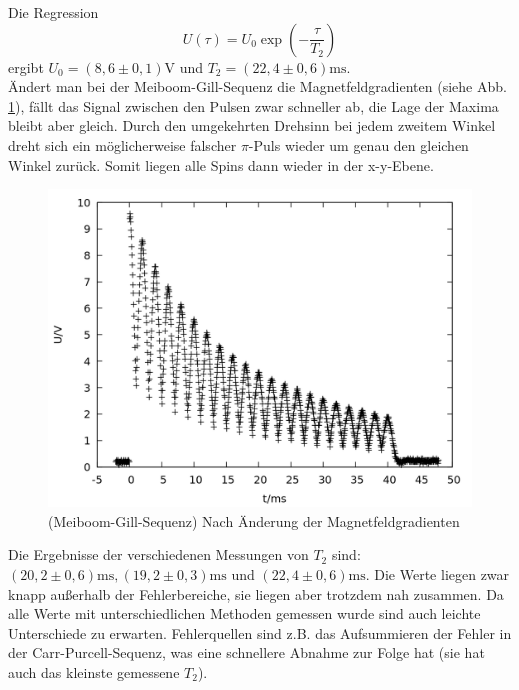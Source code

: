 Die Regression $$U(\tau) = U_0\exp{\left(-\frac{\tau}{T_2}\right)}$$ ergibt $U_0 = (8,6\pm 0,1)\si{\volt}$ und $T_2 = (22,4\pm 0,6) \si{\milli\second}$.\\

Ändert man bei der Meiboom-Gill-Sequenz die Magnetfeldgradienten (siehe Abb. \ref{fig:gill_b}), fällt das Signal zwischen den Pulsen zwar schneller ab, die Lage der Maxima bleibt aber gleich. Durch den umgekehrten Drehsinn bei jedem zweitem Winkel dreht sich ein möglicherweise falscher $\pi$-Puls wieder um genau den gleichen Winkel zurück. Somit liegen alle Spins dann wieder in der x-y-Ebene.\\
  
\begin{figure}[h]
\centering
\includegraphics[width=0.75\linewidth]{data/p402_443_data/meiboom_gill_sequenz/plot_161.png}
\caption{(Meiboom-Gill-Sequenz) Nach Änderung der Magnetfeldgradienten}
\label{fig:gill_b}
\end{figure}

Die Ergebnisse der verschiedenen Messungen von $T_2$ sind: $(20,2\pm 0,6) \si{\milli\second},  (19,2\pm 0,3) \si{\milli\second}$ und $(22,4\pm 0,6) \si{\milli\second}$. Die Werte liegen zwar knapp außerhalb der Fehlerbereiche, sie liegen aber trotzdem nah zusammen. Da alle Werte mit unterschiedlichen Methoden gemessen wurde sind auch leichte Unterschiede zu erwarten. Fehlerquellen sind z.B. das Aufsummieren der Fehler in der Carr-Purcell-Sequenz, was eine schnellere Abnahme zur Folge hat (sie hat auch das kleinste gemessene $T_2$).
